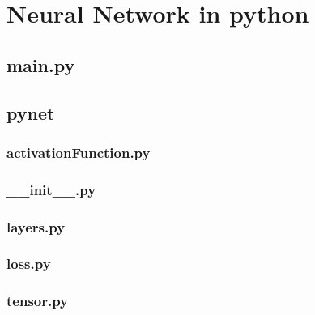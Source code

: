\documentclass[12pt]{article}
\newcommand{\incNN}[2]{\label{demo:#2}\newpage}
\begin{document}
\section{Neural Network in python}
\subsection{main.py}														\incNN{python}{main.py}
\subsection{pynet}															%
\subsubsection{activationFunction.py}							\incNN{python}{pynet/activationFunction.py}
\subsubsection{\_\_init\_\_.py}											\incNN{python}{pynet/__init__.py}
\subsubsection{layers.py}												\incNN{python}{pynet/layers.py}
\subsubsection{loss.py}													\incNN{python}{pynet/loss.py}
\subsubsection{tensor.py}												\incNN{python}{pynet/tensor.py}
\end{document}
